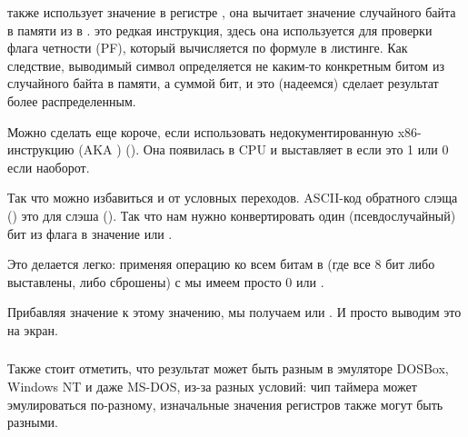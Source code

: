  также использует значение в регистре , она вычитает значение
случайного байта в памяти из
  в .
 это редкая инструкция, здесь она используется для проверки флага четности (PF),
который вычисляется по формуле в листинге.
Как следствие, выводимый символ определяется не каким-то конкретным битом из случайного байта в памяти,
а суммой бит, и это (надеемся) сделает результат более распределенным.

Можно сделать еще короче, если использовать недокументированную x86-инструкцию  (\ac{AKA} ) ().
Она появилась в \ac{CPU} и выставляет  в 
 если  это 1 или 0 если наоборот.



Так что можно избавиться и от условных переходов.
\ac{ASCII}-код обратного слэща (\q{\textbackslash{}}) 
это  \AndENRU {} для слэша (\q{/}).
%
Так что нам нужно конвертировать один (псевдослучайный) бит из флага  в значение  или .

%
Это делается легко: применяя операцию  ко всем битам в  (где все 8 бит либо выставлены, либо сброшены) с  мы имеем просто 0 или .

%
Прибавляя значение  к этому значению, мы получаем  или .
И просто выводим это на экран.

\subsubsection{\Conclusion{}}

Также стоит отметить, что результат может быть разным в эмуляторе DOSBox, \gls{Windows NT} и даже MS-DOS, 
из-за разных условий:
чип таймера может эмулироваться по-разному, изначальные значения регистров также могут быть разными.
